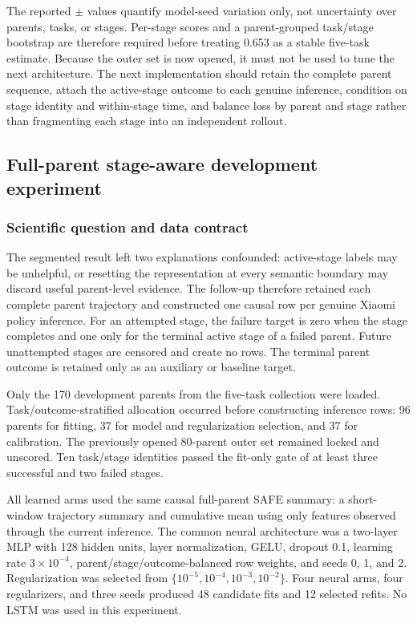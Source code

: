 \documentclass[11pt,a4paper]{article}
\begin{document}
The reported $\pm$ values quantify model-seed variation only, not uncertainty
over parents, tasks, or stages. Per-stage scores and a parent-grouped
task/stage bootstrap are therefore required before treating 0.653 as a stable
five-task estimate. Because the outer set is now opened, it must not be used to
tune the next architecture. The next implementation should retain the complete
parent sequence, attach the active-stage outcome to each genuine inference,
condition on stage identity and within-stage time, and balance loss by parent
and stage rather than fragmenting each stage into an independent rollout.

\subsection{Full-parent stage-aware development experiment}

\subsubsection{Scientific question and data contract}
The segmented result left two explanations confounded: active-stage labels may
be unhelpful, or resetting the representation at every semantic boundary may
discard useful parent-level evidence. The follow-up therefore retained each
complete parent trajectory and constructed one causal row per genuine Xiaomi
policy inference. For an attempted stage, the failure target is zero when the
stage completes and one only for the terminal active stage of a failed parent.
Future unattempted stages are censored and create no rows. The terminal parent
outcome is retained only as an auxiliary or baseline target.

Only the 170 development parents from the five-task collection were loaded.
Task/outcome-stratified allocation occurred before constructing inference
rows: 96 parents for fitting, 37 for model and regularization selection, and
37 for calibration. The previously opened 80-parent outer set remained locked
and unscored. Ten task/stage identities passed the fit-only gate of at least
three successful and two failed stages.

All learned arms used the same causal full-parent SAFE summary: a short-window
trajectory summary and cumulative mean using only features observed through
the current inference. The common neural architecture was a two-layer MLP with
128 hidden units, layer normalization, GELU, dropout 0.1, learning rate
$3\times10^{-4}$, parent/stage/outcome-balanced row weights, and seeds 0, 1,
and 2. Regularization was selected from
$\{10^{-5},10^{-4},10^{-3},10^{-2}\}$. Four neural arms, four regularizers,
and three seeds produced 48 candidate fits and 12 selected refits. No LSTM was
used in this experiment.
\end{document}
